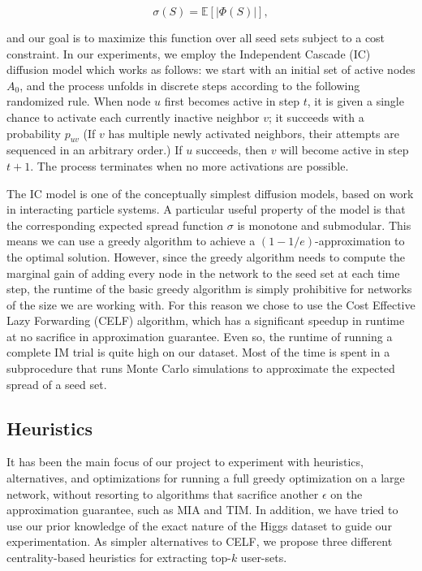 \documentclass[sigconf]{acmart}
\begin{document}
\begin{equation}
\sigma(S) = \mathbb{E}\left[ |\Phi(S)| \right],
\end{equation}

and our goal is to maximize this function over all seed sets subject to a cost constraint. In our experiments, we employ the Independent Cascade (IC) diffusion model which works as follows: we start with an initial set of active nodes $A_0$, and the process unfolds in discrete steps according to the following randomized rule. When node $u$ first becomes active in step $t$, it is given a single chance to activate each currently inactive neighbor $v$; it succeeds with a probability $p_{uv}$ (If $v$ has multiple newly activated neighbors, their attempts are sequenced in an arbitrary order.) If $u$ succeeds, then $v$ will become active in step $t + 1$. The process terminates when no more activations are possible.

The IC model is one of the conceptually simplest diffusion models, based on work in interacting particle systems. A particular useful property of the model is that the corresponding expected spread function $\sigma$ is monotone and submodular. This means we can use a greedy algorithm to achieve a $(1 - 1/e)$-approximation to the optimal solution. However, since the greedy algorithm needs to compute the marginal gain of adding every node in the network to the seed set at each time step, the runtime of the basic greedy algorithm is simply prohibitive for networks of the size we are working with. For this reason we chose to use the Cost Effective Lazy Forwarding (CELF) algorithm, which has a significant speedup in runtime at no sacrifice in approximation guarantee. Even so, the runtime of running a complete IM trial is quite high on our dataset. Most of the time is spent in a subprocedure that runs Monte Carlo simulations to approximate the expected spread of a seed set. 

\subsection{Heuristics}

It has been the main focus of our project to experiment with heuristics, alternatives, and optimizations for running a full greedy optimization on a large network, without resorting to algorithms that sacrifice another $\epsilon$ on the approximation guarantee, such as MIA and TIM. In addition, we have tried to use our prior knowledge of the exact nature of the Higgs dataset to guide our experimentation. As simpler alternatives to CELF, we propose three different centrality-based heuristics for extracting top-$k$ user-sets.
\end{document}
